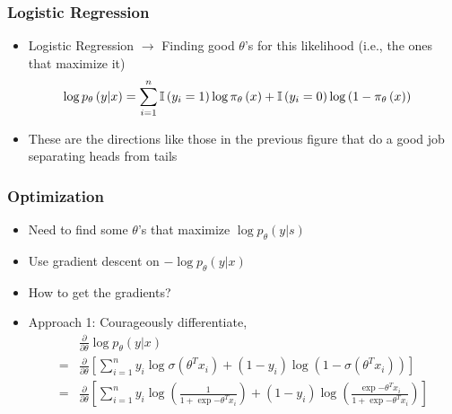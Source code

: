 \documentclass[10pt,mathserif]{beamer}
\begin{document}
\begin{frame}
  \frametitle{Logistic Regression}
  \begin{itemize}
  \item Logistic Regression $\rightarrow$ Finding good $\theta$'s for this
    likelihood (i.e., the ones that maximize it)
    \begin{align*}
      \log p_{\theta}\left(y \vert x\right) &= \sum_{i = 1}^{n} \mathbb{I}\left({y_i = 1}\right)\log \pi_{\theta}\left(x\right) + \mathbb{I}\left({y_i = 0}\right)\log\left(1 - \pi_{\theta}\left(x\right)\right)
    \end{align*}
  \item These are the directions like those in the previous figure that do a
    good job separating heads from tails
  \end{itemize}
\end{frame}

\begin{frame}
  \frametitle{Optimization}
  \begin{itemize}
  \item Need to find some $\theta$'s that maximize $\log p_{\theta}\left(y \vert s\right)$
  \item Use gradient descent on $-\log p_{\theta}\left(y \vert x\right)$
  \item How to get the gradients?
  \item Approach 1: Courageously differentiate,
    \begin{align*}
      &\frac{\partial}{\partial \theta}\log p_{\theta}\left(y \vert x\right) \\
      = &\frac{\partial}{\partial \theta} \left[\sum_{i = 1}^{n} y_i \log \sigma\left(\theta^{T}x_{i}\right) + \left(1 - y_i\right)\log\left(1 - \sigma\left(\theta^{T}x_i\right)\right)\right] \\
      = &\frac{\partial}{\partial \theta}\left[\sum_{i = 1}^{n}
        y_i \log\left(\frac{1}{1 + \exp{-\theta^{T}x_i}}\right) +
          \left(1 - y_i\right)\log\left(\frac{\exp{-\theta^{T}x_i}}{1 + \exp{-\theta^{T}x_i}}\right) \right]
    \end{align*}
  \end{itemize}
\end{frame}
\end{document}
